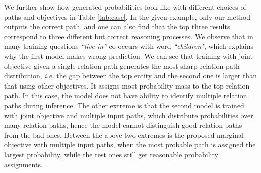 
We further show how generated probabilities look like with different choices of paths and objectives in Table \ref{tab:case}. In the given example, only our method outputs the correct path, and one can also find that the top three results correspond to three different but correct reasoning processes. We observe that in many training questions \textit{``live in''} co-occurs with word \textit{``children"}, which explains why the first model makes wrong prediction. %
We can see that training with joint objective given a single relation path generates the most sharp relation path distribution, \emph{i.e.} the gap between the top entity and the second one is larger than that using other objectives. It assigns most probability mass to the top relation path. In this case, the model does not have ability to identify multiple relation paths during inference. The other extreme is that the second model is trained with joint objective and multiple input paths, which distribute probabilities over many relation paths, hence the model cannot distinguish good relation paths from the bad ones. Between the above two extremes is the proposed marginal objective with multiple input paths, when the most probable path is assigned the largest probability, while the rest ones still get reasonable probability assignments. %


